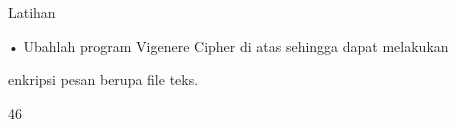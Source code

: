 \documentclass{article}
\begin{document}

Latihan

• Ubahlah program Vigenere Cipher di atas sehingga dapat melakukan 

enkripsi pesan berupa file teks.

46
\end{document}
